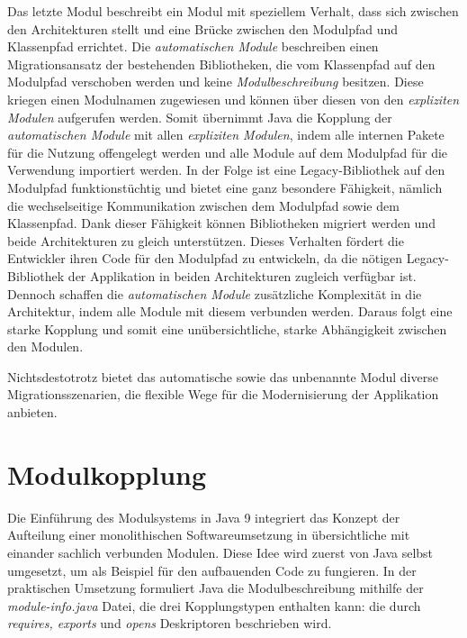     Das letzte Modul beschreibt ein Modul mit speziellem Verhalt, dass sich zwischen den Architekturen stellt und eine Brücke zwischen den Modulpfad und Klassenpfad errichtet. Die \textit{automatischen Module} beschreiben einen Migrationsansatz der bestehenden Bibliotheken, die vom Klassenpfad auf den Modulpfad verschoben werden und keine \textit{Modulbeschreibung} besitzen. Diese kriegen einen Modulnamen zugewiesen und können über diesen von den \textit{expliziten Modulen} aufgerufen werden. Somit übernimmt Java die Kopplung der \textit{automatischen Module} mit allen \textit{expliziten Modulen}, indem alle internen Pakete für die Nutzung offengelegt werden und alle Module auf dem Modulpfad für die Verwendung importiert werden. In der Folge ist eine Legacy-Bibliothek auf den Modulpfad funktionstüchtig und bietet eine ganz besondere Fähigkeit, nämlich die wechselseitige Kommunikation zwischen dem Modulpfad sowie dem Klassenpfad. Dank dieser Fähigkeit können Bibliotheken migriert werden und beide Architekturen zu gleich unterstützen. Dieses Verhalten fördert die Entwickler ihren Code für den Modulpfad zu entwickeln, da die nötigen Legacy-Bibliothek der Applikation in beiden Architekturen zugleich verfügbar ist.\newline 
    Dennoch schaffen die \textit{automatischen Module} zusätzliche Komplexität in die Architektur, indem alle Module mit diesem verbunden werden. Daraus folgt eine starke Kopplung und somit eine unübersichtliche, starke Abhängigkeit zwischen den Modulen.\cite{modulMitJava9,java9modRevealed,modulProgJava9}\bigbreak

    Nichtsdestotrotz bietet das automatische sowie das unbenannte Modul diverse Migrationsszenarien, die flexible Wege für die Modernisierung der Applikation anbieten. 

  \section{Modulkopplung} \label{sec:mod_kop}
    Die Einführung des Modulsystems in Java 9 integriert das Konzept der Aufteilung einer monolithischen Softwareumsetzung in übersichtliche mit einander sachlich verbunden Modulen. Diese Idee wird zuerst von Java selbst umgesetzt, um als Beispiel für den aufbauenden Code zu fungieren. In der praktischen Umsetzung formuliert Java die Modulbeschreibung mithilfe der \textit{module-info.java} Datei, die drei Kopplungstypen enthalten kann: die durch \textit{requires, exports} und \textit{opens} Deskriptoren beschrieben wird.

